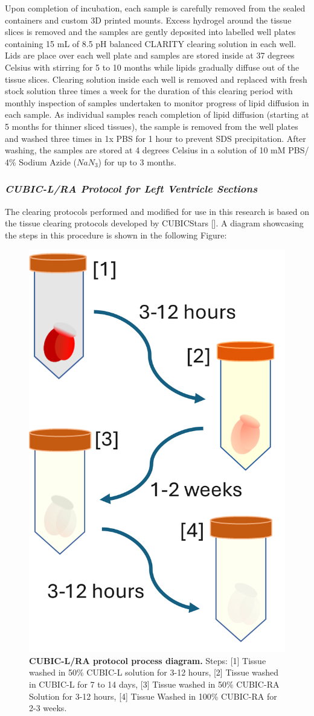Upon completion of incubation, each sample is carefully removed from the sealed containers and custom 3D printed mounts. Excess hydrogel around the tissue slices is removed and the samples are gently deposited into labelled well plates containing 15 mL of 8.5 pH balanced CLARITY clearing solution in each well. Lids are place over each well plate and samples are stored inside at 37 degrees Celsius with stirring for 5 to 10 months while lipids gradually diffuse out of the tissue slices. Clearing solution inside each well is removed and replaced with fresh stock solution three times a week for the duration of this clearing period with monthly inspection of samples undertaken to monitor progress of lipid diffusion in each sample. As individual samples reach completion of lipid diffusion (starting at 5 months for thinner sliced tissues), the sample is removed from the well plates and washed three times in 1x PBS for 1 hour to prevent SDS precipitation. After washing, the samples are stored at 4 degrees Celsius in a solution of 10 mM PBS/ 4\% Sodium Azide ($NaN_3$) for up to 3 months. 


\subsubsection{\textit{CUBIC-L/RA Protocol for Left Ventricle Sections}}

The clearing protocols performed and modified for use in this research is based on the tissue clearing protocols developed by CUBICStars []. A diagram showcasing the steps in this procedure is shown in the following Figure:

\begin{figure}[H]
    \centering
    \includegraphics[width=0.5\linewidth]{Figures/Figure3.2.png}
    \caption{\textbf{CUBIC-L/RA protocol process diagram.} Steps: [1] Tissue washed in 50\% CUBIC-L solution for 3-12 hours, [2] Tissue washed in CUBIC-L for 7 to 14 days, [3] Tissue washed in 50\% CUBIC-RA Solution for 3-12 hours, [4] Tissue Washed in 100\% CUBIC-RA for 2-3 weeks.}
    \label{fig:enter-label}
\end{figure}


